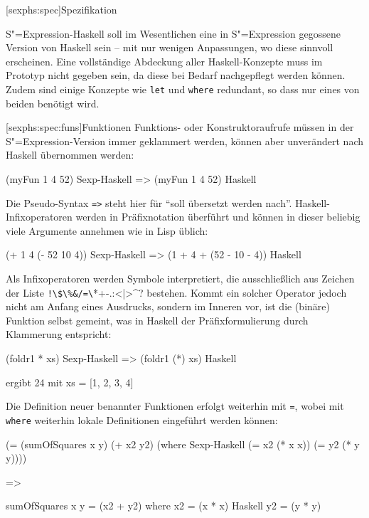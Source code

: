 \documentclass[12pt, a4paper, bibgerm]{scrbook}
\newenvironment{DIFnomarkup}{}{}
\newcommand\icode[1]{\lstinline?#1?}
\newcommand\lsection{}
\newcommand\lsubsection{}
\newcommand{\sexp}{S"=Expression}
\begin{document}
\lsection[sexphs:spec]{Spezifikation}

\sexp{}-Haskell soll im Wesentlichen eine in \sexp{} gegossene Version
von Haskell sein -- mit nur wenigen Anpassungen, wo diese sinnvoll
erscheinen. Eine vollständige Abdeckung aller Haskell-Konzepte muss im
Prototyp nicht gegeben sein, da diese bei Bedarf nachgepflegt werden
können. Zudem sind einige Konzepte wie \icode{let} und \icode{where}
redundant, so dass nur eines von beiden benötigt wird. 

\lsubsection[sexphs:spec:funs]{Funktionen}
Funktions- oder Konstruktoraufrufe müssen in der \sexp{}-Version immer
geklammert werden, können aber unverändert nach Haskell übernommen
werden:
\begin{DIFnomarkup}\begin{code}
(myFun 1 4 52)              Sexp-Haskell
=>
(myFun 1 4 52)              Haskell
\end{code}\end{DIFnomarkup}
Die Pseudo-Syntax \icode{=>} steht hier für ``soll übersetzt werden
nach''.  Haskell-Infixoperatoren werden in Präfixnotation überführt und
können in dieser beliebig viele Argumente annehmen wie in Lisp üblich:
\begin{DIFnomarkup}\begin{code}
(+ 1 4 (- 52 10 4))         Sexp-Haskell
=>
(1 + 4 + (52 - 10 - 4))     Haskell
\end{code}\end{DIFnomarkup}
Als Infixoperatoren werden Symbole interpretiert, die ausschließlich
aus Zeichen der Liste \icode{!\$\%&/=\?*+-.:<|>^}
bestehen. Kommt ein solcher Operator jedoch nicht am Anfang eines
Ausdrucks, sondern im Inneren vor, ist die (binäre) Funktion selbst
gemeint, was in Haskell der Präfixformulierung durch Klammerung
entspricht:
\begin{DIFnomarkup}\begin{code}
(foldr1 * xs)               Sexp-Haskell
=>
(foldr1 (*) xs)             Haskell

ergibt 24 mit xs = [1, 2, 3, 4]
\end{code}\end{DIFnomarkup}
Die Definition neuer benannter Funktionen erfolgt weiterhin mit
\icode{=}, wobei mit \icode{where} weiterhin lokale Definitionen
eingeführt werden können:
\begin{DIFnomarkup}\begin{code}
(= (sumOfSquares x y)
   (+ x2 y2)
 (where                     Sexp-Haskell
  (= x2 (* x x))
  (= y2 (* y y))))

=>

sumOfSquares x y = (x2 + y2)
  where
    x2 = (x * x)            Haskell
    y2 = (y * y)
\end{code}\end{DIFnomarkup}
\end{document}
